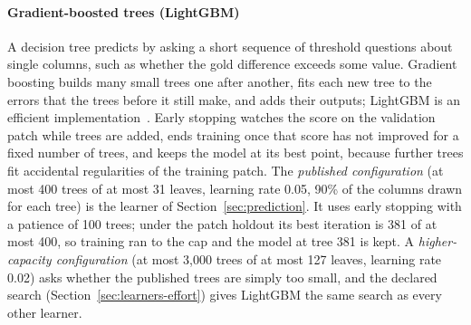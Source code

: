 \paragraph{Gradient-boosted trees (LightGBM)}
A decision tree predicts by asking a short sequence of threshold questions about single columns, such as
whether the gold difference exceeds some value. Gradient boosting builds many small trees one after
another, fits each new tree to the errors that the trees before it still make, and adds their outputs;
LightGBM is an efficient implementation~\cite{ke2017lightgbm}. Early stopping watches the score on the
validation patch while trees are added, ends training once that score has not improved for a fixed number
of trees, and keeps the model at its best point, because further trees fit accidental regularities of the
training patch. The \emph{published configuration} (at most 400 trees of at most 31 leaves, learning rate
0.05, 90\% of the columns drawn for each tree) is the learner of Section~\ref{sec:prediction}. It uses
early stopping with a patience of 100 trees; under the patch holdout its best iteration is 381 of at most
400, so training ran to the cap and the model at tree 381 is kept. A \emph{higher-capacity configuration}
(at most 3,000 trees of at most 127 leaves, learning rate 0.02) asks whether the published trees are simply
too small, and the declared search (Section~\ref{sec:learners-effort}) gives LightGBM the same search as
every other learner.

